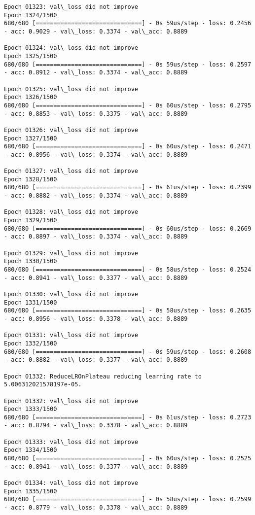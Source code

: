 \documentclass[11pt]{article}
\begin{document}
\begin{Verbatim}[commandchars=\\\{\}]
Epoch 01323: val\_loss did not improve
Epoch 1324/1500
680/680 [==============================] - 0s 59us/step - loss: 0.2456 - acc: 0.9029 - val\_loss: 0.3374 - val\_acc: 0.8889

Epoch 01324: val\_loss did not improve
Epoch 1325/1500
680/680 [==============================] - 0s 59us/step - loss: 0.2597 - acc: 0.8912 - val\_loss: 0.3374 - val\_acc: 0.8889

Epoch 01325: val\_loss did not improve
Epoch 1326/1500
680/680 [==============================] - 0s 60us/step - loss: 0.2795 - acc: 0.8853 - val\_loss: 0.3375 - val\_acc: 0.8889

Epoch 01326: val\_loss did not improve
Epoch 1327/1500
680/680 [==============================] - 0s 60us/step - loss: 0.2471 - acc: 0.8956 - val\_loss: 0.3374 - val\_acc: 0.8889

Epoch 01327: val\_loss did not improve
Epoch 1328/1500
680/680 [==============================] - 0s 61us/step - loss: 0.2399 - acc: 0.8882 - val\_loss: 0.3374 - val\_acc: 0.8889

Epoch 01328: val\_loss did not improve
Epoch 1329/1500
680/680 [==============================] - 0s 60us/step - loss: 0.2669 - acc: 0.8897 - val\_loss: 0.3374 - val\_acc: 0.8889

Epoch 01329: val\_loss did not improve
Epoch 1330/1500
680/680 [==============================] - 0s 58us/step - loss: 0.2524 - acc: 0.8941 - val\_loss: 0.3377 - val\_acc: 0.8889

Epoch 01330: val\_loss did not improve
Epoch 1331/1500
680/680 [==============================] - 0s 58us/step - loss: 0.2635 - acc: 0.8956 - val\_loss: 0.3378 - val\_acc: 0.8889

Epoch 01331: val\_loss did not improve
Epoch 1332/1500
680/680 [==============================] - 0s 59us/step - loss: 0.2608 - acc: 0.8882 - val\_loss: 0.3377 - val\_acc: 0.8889

Epoch 01332: ReduceLROnPlateau reducing learning rate to 5.006312021578197e-05.

Epoch 01332: val\_loss did not improve
Epoch 1333/1500
680/680 [==============================] - 0s 61us/step - loss: 0.2723 - acc: 0.8794 - val\_loss: 0.3378 - val\_acc: 0.8889

Epoch 01333: val\_loss did not improve
Epoch 1334/1500
680/680 [==============================] - 0s 60us/step - loss: 0.2525 - acc: 0.8941 - val\_loss: 0.3377 - val\_acc: 0.8889

Epoch 01334: val\_loss did not improve
Epoch 1335/1500
680/680 [==============================] - 0s 58us/step - loss: 0.2599 - acc: 0.8779 - val\_loss: 0.3378 - val\_acc: 0.8889


\end{Verbatim}
\end{document}
